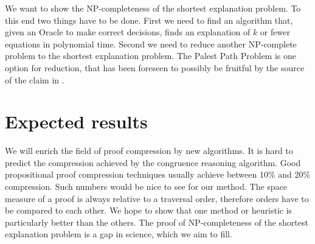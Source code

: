 We want to show the NP-completeness of the shortest explanation problem.
To this end two things have to be done.
First we need to find an algorithm that, given an Oracle to make correct decisions, finds an explanation of $k$ or fewer equations in polynomial time.
Second we need to reduce another NP-complete problem to the shortest explanation problem.
The Palest Path Problem \cite{Tiwari} is one option for reduction, that has been foreseen to possibly be fruitful by the source of the claim in \cite{Nieuwenhuis2007,Nieuwenhuis2005}.

\section{Expected results}

We will enrich the field of proof compression by new algorithms.
It is hard to predict the compression achieved by the congruence reasoning algorithm.
Good propositional proof compression techniques usually achieve between 10\% and 20\% compression.
Such numbers would be nice to see for our method.
The space measure of a proof is always relative to a traversal order, therefore orders have to be compared to each other.
We hope to show that one method or heuristic is particularly better than the others.
The proof of NP-completeness of the shortest explanation problem is a gap in science, which we aim to fill.